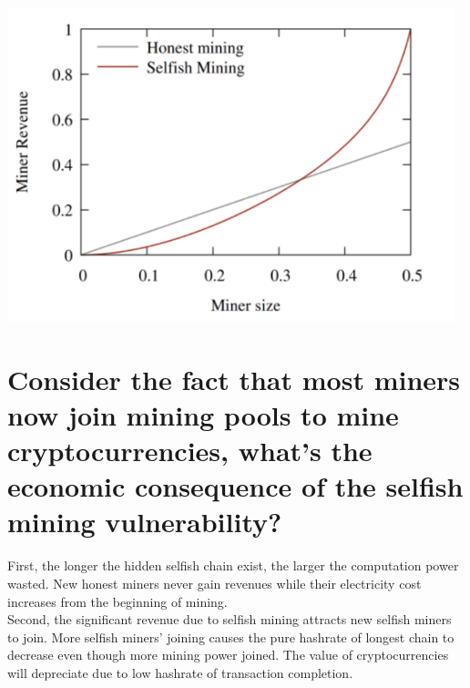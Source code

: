 \documentclass{article}
\begin{document}
\\\includegraphics[width=130mm,scale=1]{mr.png}\\
\section{Consider the fact that most miners now join mining pools to mine
cryptocurrencies, what’s the economic consequence of the selfish mining
vulnerability?}
First, the longer the hidden selfish chain exist, the larger the computation power wasted.
New honest miners never gain revenues while their electricity cost increases from the beginning of mining.\\
Second, the significant revenue due to selfish mining attracts new selfish miners to join.
More selfish miners' joining causes the pure hashrate of longest chain to decrease 
even though more mining power joined. 
The value of cryptocurrencies will depreciate due to low hashrate of transaction completion.
\end{document}
